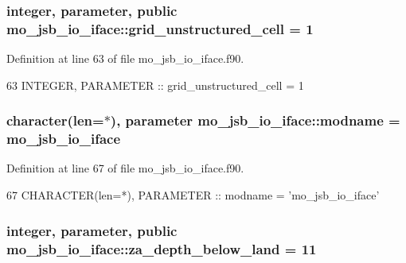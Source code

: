 \subsubsection[{grid\+\_\+unstructured\+\_\+cell}]{\setlength{\rightskip}{0pt plus 5cm}integer, parameter, public mo\+\_\+jsb\+\_\+io\+\_\+iface\+::grid\+\_\+unstructured\+\_\+cell = 1}\label{namespacemo__jsb__io__iface_a4923bf314c5fffee744c897b5d7b82ae}


Definition at line 63 of file mo\+\_\+jsb\+\_\+io\+\_\+iface.\+f90.


\begin{DoxyCode}
63   \textcolor{keywordtype}{INTEGER}, \textcolor{keywordtype}{PARAMETER} :: grid\_unstructured\_cell =  1
\end{DoxyCode}
\hypertarget{namespacemo__jsb__io__iface_aba3d7fda335dca67008e7972403aebf6}{}
\subsubsection[{modname}]{\setlength{\rightskip}{0pt plus 5cm}character(len=$\ast$), parameter mo\+\_\+jsb\+\_\+io\+\_\+iface\+::modname = \textquotesingle{}mo\+\_\+jsb\+\_\+io\+\_\+iface\textquotesingle{}}\label{namespacemo__jsb__io__iface_aba3d7fda335dca67008e7972403aebf6}


Definition at line 67 of file mo\+\_\+jsb\+\_\+io\+\_\+iface.\+f90.


\begin{DoxyCode}
67   \textcolor{keywordtype}{CHARACTER(len=*)}, \textcolor{keywordtype}{PARAMETER} :: modname = \textcolor{stringliteral}{'mo\_jsb\_io\_iface'}
\end{DoxyCode}
\hypertarget{namespacemo__jsb__io__iface_a79c0041a5e9568c7cb97d79f478ce461}{}
\subsubsection[{za\+\_\+depth\+\_\+below\+\_\+land}]{\setlength{\rightskip}{0pt plus 5cm}integer, parameter, public mo\+\_\+jsb\+\_\+io\+\_\+iface\+::za\+\_\+depth\+\_\+below\+\_\+land = 11}\label{namespacemo__jsb__io__iface_a79c0041a5e9568c7cb97d79f478ce461}


